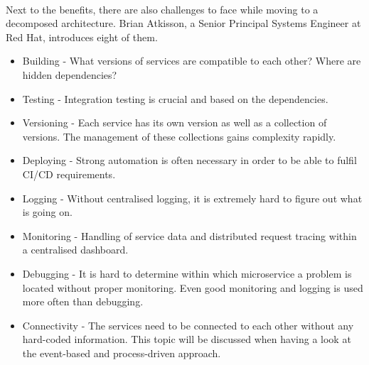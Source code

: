 \\
Next to the benefits, there are also challenges to face while moving to a decomposed architecture. Brian Atkisson, a Senior Principal Systems Engineer at Red Hat, introduces eight of them. 
\begin{itemize}
    \item Building - What versions of services are compatible to each other? Where are hidden dependencies?
    \item Testing - Integration testing is crucial and based on the dependencies. 
    \item Versioning - Each service has its own version as well as a collection of versions. The management of these collections gains complexity rapidly.
    \item Deploying - Strong automation is often necessary in order to be able to fulfil CI/CD requirements.
    \item Logging - Without centralised logging, it is extremely hard to figure out what is going on.
    \item Monitoring - Handling of service data and distributed request tracing within a centralised dashboard.
    \item Debugging - It is hard to determine within which microservice  a problem is located without proper monitoring. Even good monitoring and logging is used more often than debugging.
    \item Connectivity - The services need to be connected to each other without any hard-coded information. This topic will be discussed when having a look at the event-based and process-driven approach. 
\end{itemize}
\cite{ChallengesMicroservices}

